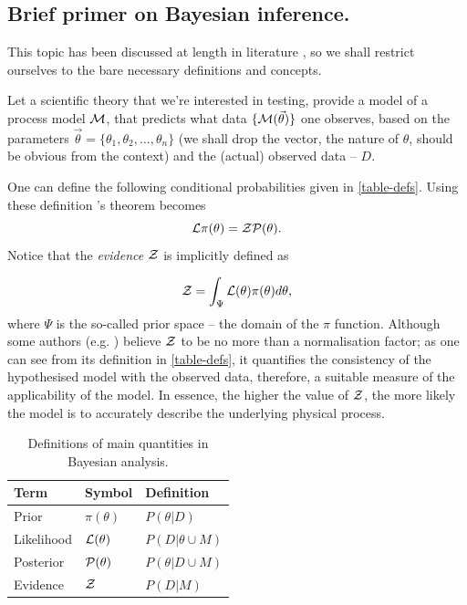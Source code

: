 \documentclass[usenatbib]{mnras}
\begin{document}
\subsection{Brief primer on Bayesian inference.}
\label{sec:org0d7e2c5}

This topic has been discussed at length in literature
\citep{jeffreys2010scientific}, so we shall restrict ourselves to the
bare necessary definitions and concepts.

Let a scientific theory that we're interested in testing, provide a
model of a process model \({\cal M}\), that predicts what data \(\lbrace {\cal M}(\vec{\theta})\rbrace\) one observes, based on the
parameters \(\vec{\theta} = \lbrace \theta_1, \theta_2, \ldots,
   \theta_n \rbrace\) (we shall drop the vector, the nature of
\(\theta\), should be obvious from the context) and the (actual)
observed data -- \(D\).

One can define the following conditional probabilities given
in \autoref{table-defs}. Using these definition \citeauthor{1763} 's theorem
becomes
\begin{equation}
 {\cal L} \pi (\theta) = {\cal Z} {\cal P} (\theta).
\label{eq:bayes} 
\end{equation}
Notice that the \emph{evidence} \({\cal Z}\) is implicitly defined as

\begin{equation}\label{eq:def-z}
 {\cal Z} = \int_{\Psi} {\cal L}(\theta) \pi(\theta) d\theta, 
\end{equation}
where \(\Psi\) is the so-called prior space -- the domain of the
\(\pi\) function. Although some authors
(e.g. \citeauthor{jeffreys2010scientific}) believe \({\cal Z}\) to be
no more than a normalisation factor; as one can see from its
definition in \autoref{table-defs}, it quantifies the consistency of
the hypothesised model with the observed data, therefore, a
suitable measure of the applicability of the model. In essence, the
higher the value of \({\cal Z}\), the more likely the model is to 
accurately describe the underlying physical process.

\begin{table}[htbp]
\caption{Definitions of main quantities in Bayesian analysis. \label{table-defs}}
\centering
\begin{tabular}{lll}
\textbf{\textbf{Term}} & \textbf{\textbf{Symbol}} & \textbf{\textbf{Definition}}\\
\hline
Prior & \(\pi(\theta)\) & \(P ( \theta  \vert D)\)\\
Likelihood & \({\cal L}(\theta)\) & \(P ( D \vert \theta \cup M)\)\\
Posterior & \({\cal P}(\theta)\) & \(P ( \theta \vert D \cup M)\)\\
Evidence & \({\cal Z}\) & \(P ( D \vert M)\)\\
\end{tabular}
\end{table}
\end{document}
